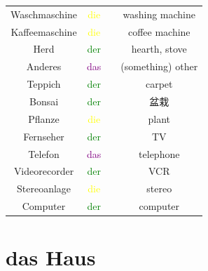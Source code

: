 \begin{center}
\begin{tabular}{|c|c|c|c|}
        Waschmaschine  & \textcolor{yellow}{die} &                                         & washing machine     \\
        Kaffeemaschine & \textcolor{yellow}{die} &                                         & coffee machine      \\
        Herd           & \textcolor{green}{der}  &                                         & hearth, stove       \\
        \hline
        Anderes        & \textcolor{purple}{das} &                                         & (something) other   \\
        Teppich        & \textcolor{green}{der}  &                                         & carpet              \\
        Bonsai         & \textcolor{green}{der}  &                                         & 盆栽                  \\
        Pflanze        & \textcolor{yellow}{die} &                                         & plant               \\
        Fernseher      & \textcolor{green}{der}  &                                         & TV                  \\
        Telefon        & \textcolor{purple}{das} &                                         & telephone           \\
        Videorecorder  & \textcolor{green}{der}  &                                         & VCR                 \\
        Stereoanlage   & \textcolor{yellow}{die} &                                         & stereo              \\
        Computer       & \textcolor{green}{der}  &                                         & computer            \\
        \hline
    \end{tabular}
\end{center}

\section{das Haus}

